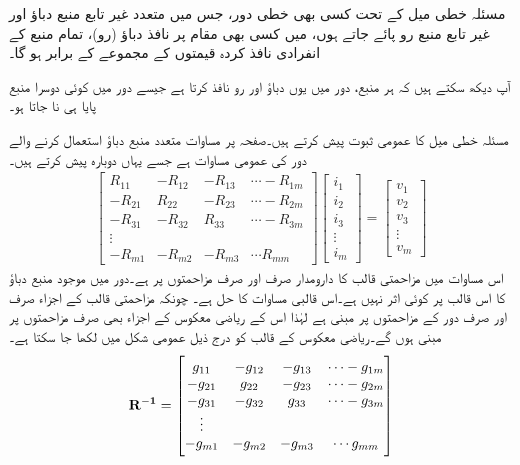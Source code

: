 مسئلہ خطی میل کے تحت کسی بھی خطی دور، جس میں متعدد غیر تابع منبع دباؤ اور غیر تابع منبع رو پائے جاتے ہوں، میں  کسی بھی مقام پر نافذ دباؤ (رو)، تمام منبع کے انفرادی نافذ کردہ قیمتوں  کے مجموعے  کے برابر ہو گا۔

آپ دیکھ سکتے ہیں کہ ہر منبع، دور میں یوں دباؤ اور رو نافذ کرتا ہے جیسے دور میں کوئی دوسرا منبع پایا ہی نا جاتا ہو۔

مسئلہ خطی میل کا عمومی ثبوت پیش کرتے ہیں۔صفحہ  پر مساوات  متعدد منبع دباؤ استعمال کرنے والے دور کی عمومی مساوات ہے جسے یہاں دوبارہ پیش کرتے ہیں۔
\begin{align}\label{مساوات_جوڑ_عمومی_مساوات_متعدد_منبع_دوبارہ}
\begin{bmatrix}
R_{11} & -R_{12}& -R_{13}& \cdots -R_{1m}\\
-R_{21} & R_{22}& -R_{23}& \cdots -R_{2m}\\
-R_{31} & -R_{32}& R_{33}& \cdots -R_{3m}\\
\vdots\\
-R_{m1}&-R_{m2}&-R_{m3}&\cdots R_{mm}
\end{bmatrix}
\begin{bmatrix}
i_1\\
i_2\\
i_3\\
\vdots\\
i_m
\end{bmatrix}
=
\begin{bmatrix}
v_{1}\\
v_{2}\\
v_{3}\\
\vdots\\
v_{m}
\end{bmatrix}
\end{align}
اس مساوات میں مزاحمتی قالب کا دارومدار صرف اور صرف مزاحمتوں پر ہے۔دور میں موجود منبع دباؤ کا اس قالب پر کوئی اثر نہیں ہے۔اس قالبی مساوات  کا حل  ہے۔ چونکہ مزاحمتی قالب  کے اجزاء صرف اور صرف دور کے مزاحمتوں پر مبنی ہے لہٰذا اس کے ریاضی معکوس  کے اجزاء بھی صرف مزاحمتوں پر مبنی ہوں گے۔ریاضی معکوس کے قالب کو درج ذیل عمومی شکل میں لکھا جا سکتا ہے۔
\begin{align*}
\bf{R^{-1}}=
\begin{bmatrix}
g_{11} & -g_{12}& -g_{13}& \cdots -g_{1m}\\
-g_{21} & g_{22}& -g_{23}& \cdots -g_{2m}\\
-g_{31} & -g_{32}& g_{33}& \cdots -g_{3m}\\
\vdots\\
-g_{m1}&-g_{m2}&-g_{m3}&\cdots g_{mm}
\end{bmatrix}
\end{align*}
